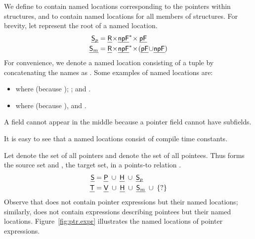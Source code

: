 \documentclass[a4paper,11pt,fleqn]{article}
\newcommand{\var}{\text{\sf\em V\/}\xspace}
\newcommand{\pointer}{\text{\sf\em P\/}\xspace}
\begin{document}
We define \structp to contain named locations corresponding to the pointers within structures, and \structm to
contain named locations for all members of structures.
For brevity, let \text{$ \rootp = (\var\!-\!\pointer)\! \cup\! \heap$} represent the root of a named location. 
\begin{align}
\structp & = \rootp \! \times\! \npfield^{*}\!\times \pfield
		\label{eq:struct.ptr}
			\\
\structm & = \rootp \! \times\! \npfield^{*} \!\times\! (\pfield\! \cup\! \npfield)
		\label{eq:struct.mem}
\end{align}
For convenience, we denote a named location consisting of a tuple  by concatenating the names
as .
Some examples of named locations are: 
\begin{itemize}
\item {} where  (because \text{$a \in         
       \var-\pointer$}); ; and .
\item  {} where  
      (because ), and . 
\end{itemize}
A field  cannot appear in the middle
because a pointer field cannot have subfields.                                                        

It is easy to see that a named locations consist of compile time constants.

Let \source denote the set of all pointers and \target denote the set of all
pointees. Thus \source forms the source set and \target, the target set, in a
points-to relation .
\begin{align}
\source & = \pointer 
		\; \cup \; \heap 
		\; \cup \; \structp
	\label{eq:ptr.src}
			\\
\target & = \var 	
		\; \cup \; \heap 
		\; \cup \; \structm
		\;  \cup \; \{?\}
	\label{eq:ptr.tgt}
\end{align}
Observe that \source does not contain pointer expressions but their named locations;
similarly, \target does not contain expressions describing pointees but
their named locations. Figure~\ref{fig:ptr.expr} illustrates the named locations of
pointer expressions.
\end{document}
